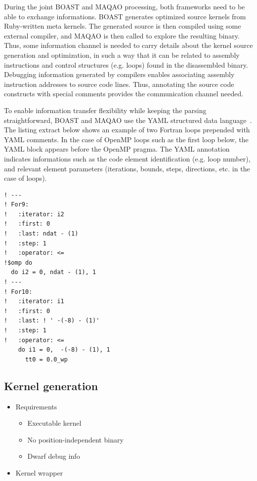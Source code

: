\documentclass[11pt, a4paper, twoside]{montblanc2}
\begin{document}

During the joint BOAST and MAQAO processing, both frameworks need to be able to exchange 
informations. BOAST generates optimized source kernels from Ruby-written meta kernels. The generated 
source is then compiled using some external compiler, and MAQAO is then called to explore the 
resulting binary. Thus, some information channel is needed to carry details about the kernel source 
generation and optimization, in such a way that it can be related to assembly instructions and 
control structures (e.g. loops) found in the disassembled binary. Debugging information generated by 
compilers enables associating assembly instruction addresses to source code lines. Thus, annotating 
the source code constructs with special comments provides the communication channel needed.

To enable information transfer flexibility while keeping the parsing straightforward, BOAST and 
MAQAO use the YAML structured data language~\cite{yaml:2017}. The listing extract below shows an 
example of two Fortran loops prepended with YAML comments. In the case of OpenMP loops such as the 
first loop below, the YAML block appears before the OpenMP pragma. The YAML annotation indicates 
informations such as the code element identification (e.g. loop number), and relevant element 
parameters (iterations, bounds, steps, directions, etc. in the case of loops).

\begin{lstlisting}[language={[90]Fortran}]
! ---
! For9:
!   :iterator: i2
!   :first: 0
!   :last: ndat - (1)
!   :step: 1
!   :operator: <=
!$omp do 
  do i2 = 0, ndat - (1), 1
! ---
! For10:
!   :iterator: i1
!   :first: 0
!   :last: ! ' -(-8) - (1)'
!   :step: 1
!   :operator: <=
    do i1 = 0,  -(-8) - (1), 1
      tt0 = 0.0_wp
\end{lstlisting}


\subsection{Kernel generation}

\begin{itemize}
  \item Requirements
    \begin{itemize}
      \item Executable kernel
      \item No position-independent binary
      \item Dwarf debug info
    \end{itemize}
  \item Kernel wrapper
\end{itemize}
\end{document}
